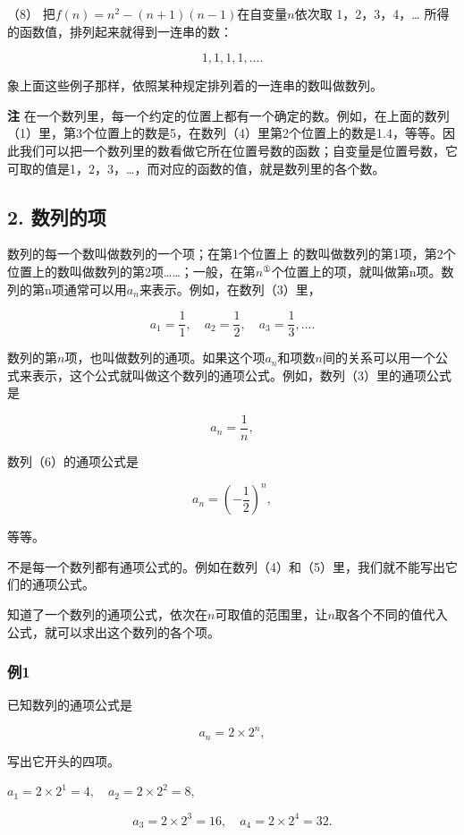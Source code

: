 （8） 把\(f(n) = n^2 - (n + 1)(n - 1)\)在自变量\(n\)依次取
1，2，3，4，\ldots{} 所得的函数值，排列起来就得到一连串的数：

\[
1, 1, 1, 1, \dots.
\]

象上面这些例子那样，依照某种规定排列着的一连串的数叫做数列。

\textbf{注}
在一个数列里，每一个约定的位置上都有一个确定的数。例如，在上面的数列（1）里，第3个位置上的数是5，在数列（4）里第2个位置上的数是1.4，等等。因此我们可以把一个数列里的数看做它所在位置号数的函数；自变量是位置号数，它可取的值是1，2，3，\ldots，而对应的函数的值，就是数列里的各个数。

\subsection{2. 数列的项}

数列的每一个数叫做数列的一个项；在第1个位置上
的数叫做数列的第1项，第2个位置上的数叫做数列的第2项\ldots\ldots；一般，在第\(n^{①}\)个位置上的项，就叫做第n项。数列的第n项通常可以用\(a_{n}\)来表示。例如，在数列（3）里，

\[
a_{1} = \frac{1}{1}, \quad a_{2} = \frac{1}{2}, \quad a_{3} = \frac{1}{3}, \dots.
\]

数列的第\(n\)项，也叫做数列的通项。如果这个项\(a_{n}\)和项数\(n\)间的关系可以用一个公式来表示，这个公式就叫做这个数列的通项公式。例如，数列（3）里的通项公式是

\[
a_{n} = \frac{1}{n},
\]

数列（6）的通项公式是

\[
a_{n} = \left(- \frac{1}{2}\right)^{n},
\]

等等。

不是每一个数列都有通项公式的。例如在数列（4）和（5）里，我们就不能写出它们的通项公式。

知道了一个数列的通项公式，依次在\(n\)可取值的范围里，让\(n\)取各个不同的值代入公式，就可以求出这个数列的各个项。

\subsubsection{例1}

已知数列的通项公式是

\[
a_{n} = 2 \times 2^{n},
\]

写出它开头的四项。

\(a_{1} = 2 \times 2^{1} = 4, \quad a_{2} = 2 \times 2^{2} = 8,\)

\[
a_{3} = 2 \times 2^{3} = 16, \quad a_{4} = 2 \times 2^{4} = 32.
\]


